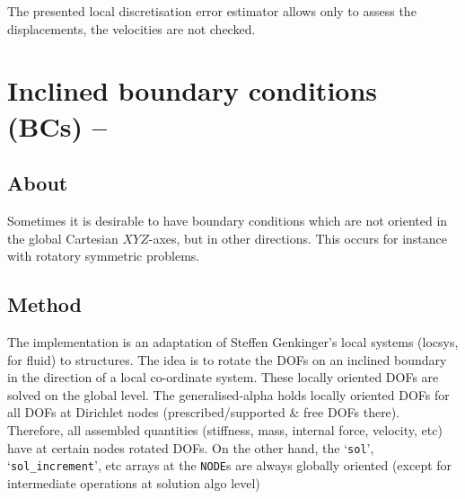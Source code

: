 The presented local discretisation error estimator allows only to assess the
displacements, the velocities are not checked. 


\section{Inclined boundary conditions (BCs) -- \ccarat{}}

\subsection{About}
Sometimes it is desirable to have boundary conditions
which are not oriented in the global Cartesian $XYZ$-axes,
but in other directions. This occurs for instance with
rotatory symmetric problems.

\subsection{Method}
The implementation is an adaptation of Steffen Genkinger's
local systems (locsys, for fluid) to structures.
The idea is to rotate the DOFs on an inclined boundary in the
direction of a local co-ordinate system. These locally oriented
DOFs are solved on the global level. The generalised-alpha holds
locally oriented DOFs for all DOFs at Dirichlet nodes
(prescribed/supported \& free DOFs there). Therefore, all assembled
quantities (stiffness, mass, internal force, velocity, etc) have
at certain nodes rotated DOFs. On the other hand, the `\texttt{sol}', 
`\texttt{sol\_increment}', etc arrays at the \texttt{NODE}s are always globally
oriented (except for intermediate operations at solution algo level)

